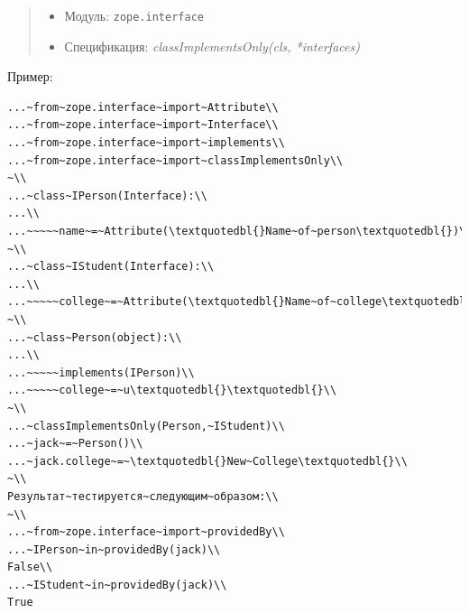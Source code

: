 \documentclass[a4paper,openany,twoside,draft]{book}
\providecommand*{\DUroletitlereference}[1]{\textsl{#1}}
\begin{document}
\begin{quote}

\begin{itemize}

\item Модуль: \texttt{zope.interface}

\item Спецификация: \DUroletitlereference{classImplementsOnly(cls, *interfaces)}

\end{itemize}

\end{quote}

Пример:

\begin{verbatim}
...~from~zope.interface~import~Attribute\\
...~from~zope.interface~import~Interface\\
...~from~zope.interface~import~implements\\
...~from~zope.interface~import~classImplementsOnly\\
~\\
...~class~IPerson(Interface):\\
...\\
...~~~~~name~=~Attribute(\textquotedbl{}Name~of~person\textquotedbl{})\\
~\\
...~class~IStudent(Interface):\\
...\\
...~~~~~college~=~Attribute(\textquotedbl{}Name~of~college\textquotedbl{})\\
~\\
...~class~Person(object):\\
...\\
...~~~~~implements(IPerson)\\
...~~~~~college~=~u\textquotedbl{}\textquotedbl{}\\
~\\
...~classImplementsOnly(Person,~IStudent)\\
...~jack~=~Person()\\
...~jack.college~=~\textquotedbl{}New~College\textquotedbl{}\\
~\\
Результат~тестируется~следующим~образом:\\
~\\
...~from~zope.interface~import~providedBy\\
...~IPerson~in~providedBy(jack)\\
False\\
...~IStudent~in~providedBy(jack)\\
True
\end{verbatim}
\end{document}
